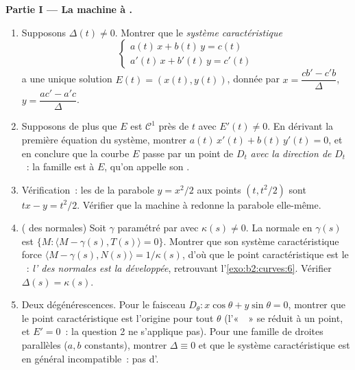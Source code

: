 \begin{problem}
\medskip
\noindent\textbf{Partie I --- La machine à .}
\begin{enumerate}
  \item Supposons $\Delta(t) \neq 0$. Montrer que le
        \emph{système caractéristique}
        \[
        \begin{cases} a(t)\,x + b(t)\,y = c(t)\\
        a'(t)\,x + b'(t)\,y = c'(t)\end{cases}
        \]
        a une unique solution $E(t) = (x(t), y(t))$, donnée par
        $x = \dfrac{cb' - c'b}{\Delta}$, $y = \dfrac{ac' -
        a'c}{\Delta}$.
  \item Supposons de plus que $E$ est $\mathcal C^1$ près de $t$
        avec $E'(t) \neq 0$. En dérivant la première
        équation du système, montrer $a(t)\,x'(t) +
        b(t)\,y'(t) = 0$, et en conclure que la courbe $E$
        passe par un point de $D_t$ \emph{avec la
        direction de} $D_t$~: la famille est  à $E$,
        qu'on appelle son \emph{}.
  \item Vérification~: les  de la parabole $y =
        x^2/2$ aux points $(t, t^2/2)$ sont $tx - y =
        t^2/2$. Vérifier que la machine à  redonne la
        parabole elle-même.
  \item ( des normales) Soit $\gamma$ paramétré par
         avec $\kappa(s) \neq 0$. La normale en
        $\gamma(s)$ est $\{M : \langle M - \gamma(s), T(s)
        \rangle = 0\}$. Montrer que son système caractéristique
        force $\langle M - \gamma(s), N(s)\rangle =
        1/\kappa(s)$, d'où que le point caractéristique est
        le ~: \emph{l' des
        normales est la développée}, retrouvant
        l'\cref{exo:b2:curves:6}. Vérifier $\Delta(s) =
        \kappa(s)$.
  \item Deux dégénérescences. Pour le faisceau $D_\theta : x\cos
        \theta + y\sin\theta = 0$, montrer que le
        point caractéristique est l'origine pour tout $\theta$
        (l'«~~» se réduit à un point, et $E' = 0$~:
        la question 2 ne s'applique pas). Pour une famille de
        droites parallèles ($a, b$ constants), montrer $\Delta
        \equiv 0$ et
        que le système caractéristique est en général
        incompatible~: pas d'.
\end{enumerate}


\end{problem}
